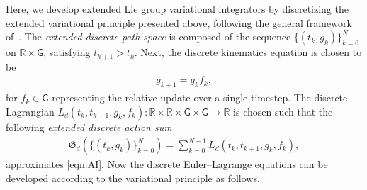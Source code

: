\documentclass[letterpaper, 10pt, conference]{ieeeconf}
\newcommand{\G}{\ensuremath{\mathsf{G}}}
\renewcommand{\Re}{\ensuremath{\mathbb{R}}}
\begin{document}
Here, we develop extended Lie group variational integrators by discretizing the extended variational principle presented above, following the general framework of~\cite{MarWesAN01}.
The \textit{extended discrete path space} is composed of the sequence $\{(t_k, g_k)\}_{k=0}^N$ on $\Re\times\G$, satisfying $t_{k+1}>t_k$.
Next, the discrete kinematics equation is chosen to be
\begin{align}
    g_{k+1} = g_k f_k, \label{eqn:gkp}
\end{align}
for $f_k \in\G$ representing the relative update over a single timestep. 
The discrete Lagrangian $L_d(t_k, t_{k+1}, g_k, f_k): \Re\times\Re\times\G\times\G\rightarrow \Re$ is chosen such that the following \textit{extended discrete action sum}
\begin{align}
    \mathfrak{G}_d(\{(t_k, g_k)\}_{k=0}^N) = \sum_{k=0}^{N-1} L_d(t_k, t_{k+1}, g_k, f_k), \label{eqn:Gd}
\end{align}
approximates \eqref{eqn:AI}. 
Now the discrete Euler--Lagrange equations can be developed according to the variational principle as follows.
\end{document}
